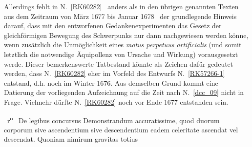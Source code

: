 \begin{ledgroup}
Allerdings fehlt in N.~\ref{RK60282} %
\textendash\ anders als %
in den übrigen genannten Texten aus dem Zeitraum von März 1677 bis Januar 1678 \textendash\ 
der grundlegende Hinweis darauf, dass mit den entworfenen Gedankenexperimenten das Gesetz der gleichförmigen Bewegung des Schwerpunks nur dann nachgewiesen werden könne, wenn zusätzlich die Unmöglichkeit eines \textit{motus perpetuus artificialis} (und somit letztlich die notwendige Äquipollenz von Ursache und Wirkung) vorausgesetzt werde.
Dieser bemerkenswerte Tatbestand könnte als Zeichen dafür gedeutet werden, dass N.~\ref{RK60282} %
eher im Vorfeld des Entwurfs N.~\ref{RK57266-1} %
entstand, d.h. noch im Winter 1676\textendash1677.
Aus demselben Grund kommt eine Datierung der vorliegenden Aufzeichnung %
auf die Zeit nach N.~\ref{dcc_09} %
nicht in Frage.
Vielmehr dürfte N.~\ref{RK60282} %
noch vor Ende 1677 entstanden sein.%
\pend%
\end{ledgroup}%
%
%
%
\frenchspacing%
 \vspace{8mm}%
 \count{}%
\count{}%
\count{}
\pstart%
\normalsize%
\noindent%
%
~r\textsuperscript{o}\rbrack\ %
\hspace{39mm}
De legibus concursus%
\protect{}%
\protect{}
\pend
\vspace{0.5em}%
%
\pstart%
\noindent%
Demonstrandum
%
%
accuratissime,
quod duorum corporum
sive ascendentium%
\protect{}
sive descendentium%
\protect{}
%
%
%
eadem celeritate ascendat vel descendat.%
\protect{}%
\protect{}
Quoniam nimirum gravitas totius%
\protect{}
